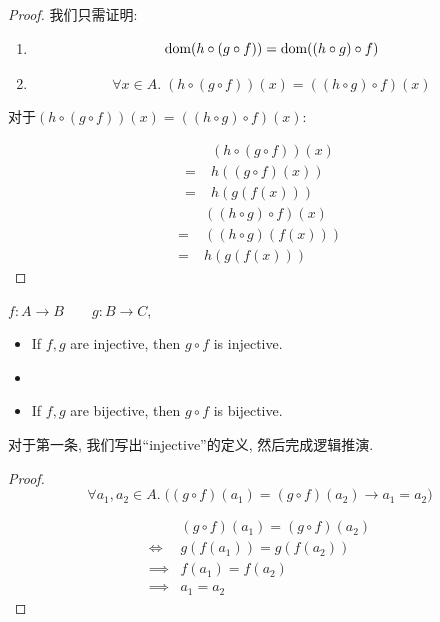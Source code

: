 \begin{proof}
  我们只需证明: 
  \begin{enumerate}
    \item
      \[
        \text{dom}(h \circ (g \circ f)) = \text{dom}((h \circ g) \circ f)
      \]
    \item
      \[
        \forall x \in A.\; (h \circ (g \circ f))(x) = ((h \circ g) \circ f)(x)
      \]
  \end{enumerate}


对于$(h \circ (g \circ f))(x) = ((h \circ g) \circ f)(x)$:


  \setcounter{equation}{0}
      \begin{align*}
        &(h \circ (g \circ f))(x) \\[6pt]
        =\; &h((g \circ f) (x)) \\[6pt]
        =\; &h(g(f(x)))
      \end{align*}
      \setcounter{equation}{0}
      \begin{align*}
        &((h \circ g) \circ f)(x) \\[6pt]
        =\; &((h \circ g) (f(x))) \\[6pt]
        =\; &h(g(f(x)))
      \end{align*}
\end{proof}

\begin{theorem}
  $f: A \to B \qquad g: B \to C$, 
  \begin{itemize}
    \item If $f, g$ are injective, then $g \circ f$ is injective.
    \item {}
    \item If $f, g$ are bijective, then $g \circ f$ is bijective.
  \end{itemize}
\end{theorem}

对于第一条, 我们写出``injective''的定义, 然后完成逻辑推演. 

\begin{proof}
  $$\forall a_1, a_2 \in A.\;
      \Big( (g \circ f)(a_1) = (g \circ f)(a_2) \to a_1 = a_2 \Big)$$

      \begin{align*}
        &(g \circ f)(a_1) = (g \circ f)(a_2) \\
        \iff &g(f(a_{1})) = g(f(a_{2})) \\[6pt]
        \implies &f(a_{1}) = f(a_{2}) \\[6pt]
        \implies &a_{1} = a_{2}
      \end{align*}


\end{proof}


